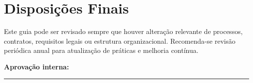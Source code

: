 \documentclass[12pt,a4paper]{article}
\begin{document}
\section{Disposições Finais}
Este guia pode ser revisado sempre que houver alteração relevante de processos, contratos, requisitos legais ou estrutura organizacional. Recomenda-se revisão periódica anual para atualização de práticas e melhoria contínua.

\vspace{0.8cm}
\noindent\textbf{Aprovação interna:} \rule{7cm}{0.4pt}
\end{document}
